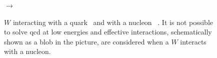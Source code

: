 \begin{figure}[]
\centering
{} \qquad \qquad $\longrightarrow$ \qquad \qquad
    \\
\caption[Feynman Diagrams and Form Factors]{$W$ interacting with a quark~\protect{} and with a nucleon ~\protect{}. It is not possible to solve \acrshort{qcd} at low energies and effective interactions, schematically shown as a blob in the picture, are considered when a $W$ interacts with a nucleon.}
\label{fig:fyW_ab}
\end{figure}


